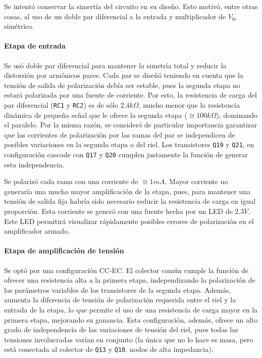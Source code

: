 \documentclass[a4paper,12pt,twoside]{article}
\begin{document}
Se intentó conservar la simertía del circuito en su diseño. Esto motivó, entre otras cosas, al uso de un doble par diferencial a la entrada y multiplicador de $V_{be}$ simétrico.

\paragraph{Etapa de entrada}

Se usó doble par diferencial para mantener la simetría total y reducir la distorsión por armónicos pares. Cada par se diseñó teniendo en cuenta que la tensión de salida de polarización debía ser estable, pues la segunda etapa no estará polarizada por una fuente de corriente. Por esto, la resistencia de carga del par diferencial (\texttt{RC1} y \texttt{RC2}) es de sólo $2.4k\Omega$, mucho menor que la resistencia dinámica de pequeña señal que le ofrece la segunda etapa ($\cong 100k\Omega$), dominando el paralelo.
Por la misma razón, se consideró de particular importancia garantizar que las corrientes de polarización por las ramas del par se independicen de posibles variaciones en la segunda etapa o del riel. Los transistores \texttt{Q19} y \texttt{Q21}, en configuración cascode con \texttt{Q17} y \texttt{Q20} cumplen justamente la función de generar esta independencia.

Se polarizó cada rama con una corriente de $\cong 1mA$. Mayor corriente no generaría una mucho mayor amplificación de la etapa, pues, para mantener una tensión de salida fija habría sido necesario reducir la resistencia de carga en igual proporción. Esta corriente se generó con una fuente hecha por un LED de $2.3V$. Este LED permitirá visualizar rápidamente posibles errores de polarización en el amplificador armado.


\paragraph{Etapa de amplificación de tensión}

Se optó por una configuración CC-EC. El colector común cumple la función de ofrecer una resistencia alta a la primera etapa, independizando la polarización de los parámetros variables de los transistores de la segunda etapa. Además, aumenta la diferencia de tensión de polarización requerida entre el riel y la entrada de la etapa, lo que permite el uso de una resistencia de carga mayor en la primera etapa, mejorando su ganancia. Esta configuración, además, ofrece un alto grado de independencia de las variaciones de tensión del riel, pues todas las tensiones involucradas varían en conjunto (la única que no lo hace es masa, pero está conectada al colector de \texttt{Q13} y \texttt{Q10}, nodos de alta impedancia). 
\end{document}
